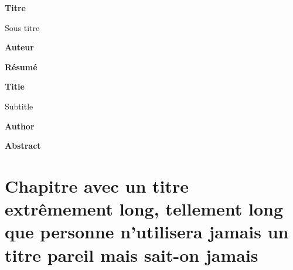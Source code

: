 \documentclass[a4paper,11pt]{report}    %
\begin{document}



\thispagestyle{empty}
\begin{center}
    \Large
    \textbf{Titre}

    \vspace{0.4cm}
    \large
    Sous titre

    \vspace{0.4cm}
    \textbf{Auteur}

    \vspace{0.9cm}
    \textbf{Résumé}
\end{center}

\blindtext


\newpage
\thispagestyle{empty}
\begin{center}
	\Large
	\textbf{Title}

	\vspace{0.4cm}
	\large
	Subtitle

	\vspace{0.4cm}
	\textbf{Author}

	\vspace{0.9cm}
	\textbf{Abstract}
\end{center}

\blindtext



\newpage
\hypersetup{pageanchor=true}
\setcounter{page}{1}
\tableofcontents

\glsaddall  %
\printglossaries

\newpage
\printnomenclature



\newpage
\chapter{Chapitre avec un titre extrêmement long, tellement long que personne n'utilisera jamais un titre pareil mais sait-on jamais}
\end{document}
